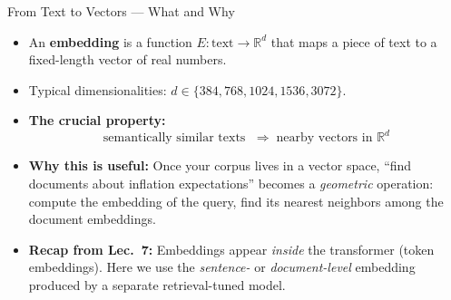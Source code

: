 \documentclass[10pt,english,aspectratio=169]{beamer}
\begin{document}
\begin{frame}{From Text to Vectors --- What and Why}
\begin{itemize}
\item An \textbf{embedding} is a function $E: \text{text} \to \mathbb{R}^d$ that maps a piece of text to a fixed-length vector of real numbers.

\medskip
\item Typical dimensionalities: $d \in \{384, 768, 1024, 1536, 3072\}$.

\medskip
\item \textbf{The crucial property:}
\[
\text{semantically similar texts } \;\Longrightarrow\; \text{nearby vectors in } \mathbb{R}^d
\]

\medskip
\item \textbf{Why this is useful:} Once your corpus lives in a vector space, ``find documents about inflation expectations'' becomes a \emph{geometric} operation: compute the embedding of the query, find its nearest neighbors among the document embeddings.

\medskip
\item \textbf{Recap from Lec.\ 7:} Embeddings appear \emph{inside} the transformer (token embeddings). Here we use the \emph{sentence-} or \emph{document-level} embedding produced by a separate retrieval-tuned model.
\end{itemize}
\end{frame}
\end{document}
